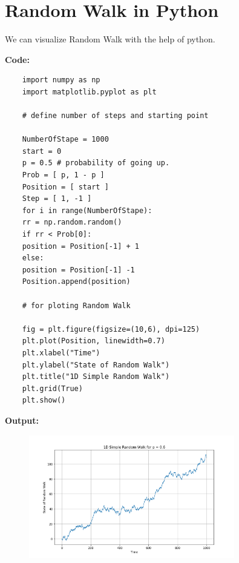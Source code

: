 \section{Random Walk in Python}
We can visualize Random Walk with the help of python.

\textbf{Code:}

\begin{lstlisting}
    import numpy as np
    import matplotlib.pyplot as plt
    
    # define number of steps and starting point
    
    NumberOfStape = 1000
    start = 0
    p = 0.5 # probability of going up.
    Prob = [ p, 1 - p ]
    Position = [ start ]
    Step = [ 1, -1 ]
    for i in range(NumberOfStape):
    rr = np.random.random()
    if rr < Prob[0]:
    position = Position[-1] + 1
    else:
    position = Position[-1] -1
    Position.append(position)

    # for ploting Random Walk
    
    fig = plt.figure(figsize=(10,6), dpi=125)
    plt.plot(Position, linewidth=0.7)
    plt.xlabel("Time")
    plt.ylabel("State of Random Walk")
    plt.title("1D Simple Random Walk")
    plt.grid(True)
    plt.show()
\end{lstlisting}

\newpage
\textbf{Output: }

\begin{figure}[htpb]
    \centering
    \includegraphics[width=0.8\textwidth]{pic/Random_Walk_0.6.png}
    \caption{}
    \label{fig:}
\end{figure}
